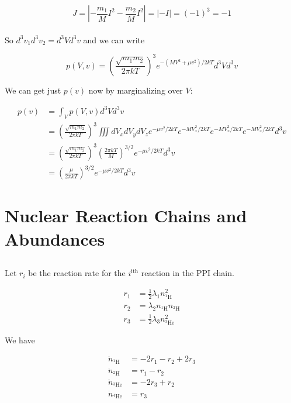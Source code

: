 \documentclass[12pt]{article}
\newcommand{\pfrac}[2]{\left(\frac{#1}{#2} \right)}
\begin{document}
\[ J = \left|  -\frac{m_1}{M}I^2 - \frac{m_2}{M}I^2 \right| = \left| -I\right| = (-1)^3 = -1
\]\\

So \(d^3 v_1 d^3 v_2 = d^3 V d^3 v\) and we can write

\[ p(V,v) = \pfrac{\sqrt{m_1 m_2}}{2\pi kT}^3 e^{-(MV^2 + \mu v^2) / 2kT} d^3 V d^3 v
\]

We can get just \(p(v)\) now by marginalizing over \(V\):

\begin{align*}
p(v) &= \int_V  p(V,v) d^3 V d^3 v \\[11pt]
&=\pfrac{\sqrt{m_1 m_2}}{2\pi kT}^3 \iiint dV_x dV_y dV_z e^{-\mu v^2 / 2kT} e^{-MV_x^2/2kT}e^{-MV_x^2/2kT}e^{-MV_x^2/2kT} d^3 v \\[11pt]
&=\pfrac{\sqrt{m_1 m_2}}{2\pi kT}^3  \pfrac{2\pi kT}{M}^{3/2} e^{-\mu v^2 / 2kT} d^3v \\[11pt]
&= \pfrac{\mu}{2\pi kT}^{3/2} e^{-\mu v^2 / 2kT} d^3v
\end{align*}

\section{Nuclear Reaction Chains and Abundances}

\subsection{}

\newcommand{\nc}[2]{n_{^{#1}\mathrm{#2}}}
\newcommand{\dnc}[2]{\dot{n}_{^{#1}\mathrm{#2}}}

Let \(r_i\) be the reaction rate for the \(i^{\mathrm{ith}}\) reaction in the PPI chain.

\begin{align*}
r_1 &= \frac{1}{2}\lambda_1 \nc{1}{H}^2 \\
r_2 &= \lambda_2 \nc{1}{H}\nc{2}{H} \\
r_3 &= \frac{1}{2}\lambda_3 \nc{3}{He}^2
\end{align*}

We have

\begin{align*}
\dnc{1}{H} &= -2r_1 - r_2 + 2r_3 \\
\dnc{2}{H} &= r_1 - r_2\\
\dnc{3}{He} &= -2r_3 + r_2 \\
\dnc{4}{He} &= r_3
\end{align*}
\end{document}
